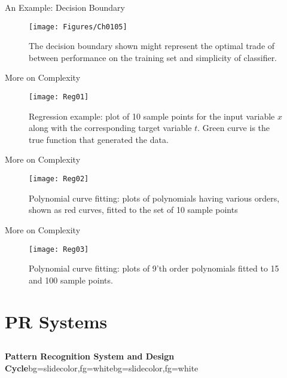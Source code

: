 \begin{frame}{An Example: Decision Boundary}
\begin{figure}
\texttt{[image: Figures/Ch0105]}
\caption{The decision boundary shown might represent the optimal trade of between performance on the training set and simplicity of classifier.}
\end{figure}
\end{frame}

\begin{frame}{More on Complexity}
\begin{figure}
\texttt{[image: Reg01]}
\caption{Regression example: plot of 10 sample points for the input variable $x$ along with the corresponding target variable $t$. Green curve is the true function that generated the data.}
\end{figure}
\end{frame}

\begin{frame}{More on Complexity}
\begin{figure}
\texttt{[image: Reg02]}
\caption{Polynomial curve fitting: plots of polynomials having various orders, shown as red curves, fitted to the set of 10 sample points}
\end{figure}
\end{frame}

\begin{frame}{More on Complexity}
\begin{figure}
\texttt{[image: Reg03]}
\caption{Polynomial curve fitting: plots of 9'th order polynomials fitted to 15 and 100 sample points.}
\end{figure}
\end{frame}

\section{PR Systems}
\subsection{}

\begin{frame}{}
\begin{variableblock}{\centering \Large \textbf{\vspace{4pt}\newline Pattern Recognition System and Design Cycle\vspace{4pt}}}{bg=slidecolor,fg=white}{bg=slidecolor,fg=white}
\end{variableblock}
\end{frame}


